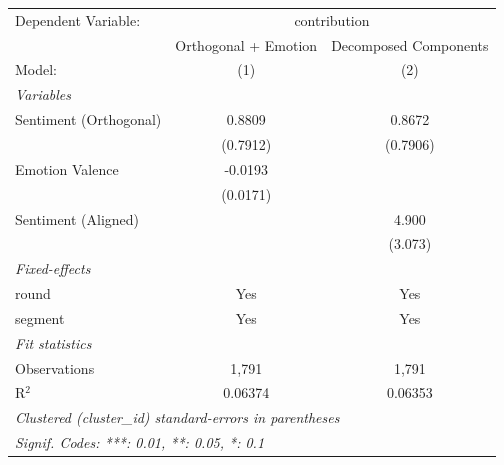 
\begingroup
\centering
\begin{tabular}{lcc}
   \tabularnewline \midrule \midrule
   Dependent Variable: & \multicolumn{2}{c}{contribution}\\
                          & Orthogonal + Emotion & Decomposed Components \\   
   Model:                 & (1)                  & (2)\\  
   \midrule
   \emph{Variables}\\
   Sentiment (Orthogonal) & 0.8809               & 0.8672\\   
                          & (0.7912)             & (0.7906)\\   
   Emotion Valence        & -0.0193              &   \\   
                          & (0.0171)             &   \\   
   Sentiment (Aligned)    &                      & 4.900\\   
                          &                      & (3.073)\\   
   \midrule
   \emph{Fixed-effects}\\
   round                  & Yes                  & Yes\\  
   segment                & Yes                  & Yes\\  
   \midrule
   \emph{Fit statistics}\\
   Observations           & 1,791                & 1,791\\  
   R$^2$                  & 0.06374              & 0.06353\\  
   \midrule \midrule
   \multicolumn{3}{l}{\emph{Clustered (cluster\_id) standard-errors in parentheses}}\\
   \multicolumn{3}{l}{\emph{Signif. Codes: ***: 0.01, **: 0.05, *: 0.1}}\\
\end{tabular}
\par\endgroup


